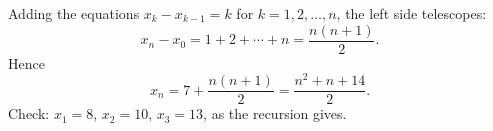 Adding the equations $x_k-x_{k-1}=k$ for $k=1,2,\dots,n$, the left side telescopes:
\[
x_n-x_0=1+2+\cdots+n=\dfrac{n(n+1)}{2}.
\]
Hence
\[
\boxed{x_n=7+\dfrac{n(n+1)}{2}=\dfrac{n^2+n+14}{2}} .
\]
Check: $x_1=8$, $x_2=10$, $x_3=13$, as the recursion gives.
